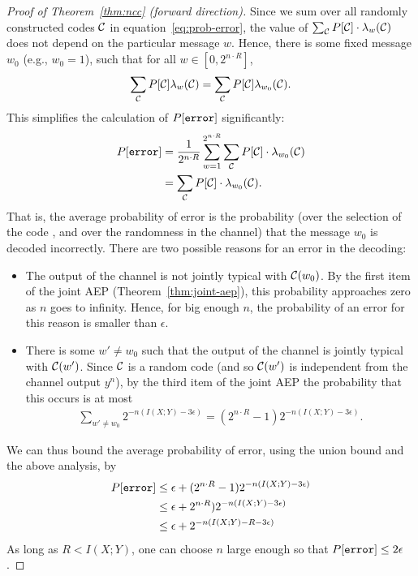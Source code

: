 \begin{proof}[Proof of Theorem~\ref{thm:ncc} (forward direction)]
Since we sum over all randomly constructed codes $\mathcal{C}$ in equation~\ref{eq:prob-error}, the value of $\sum_{\mathcal{C}} P[\mathcal{C}] \cdot \lambda_w(\mathcal{C})$ does not depend on the particular message $w$. Hence, there is some fixed message $w_0$ (e.g., $w_0 = 1$), such that for all $w \in [0,2^{n \cdot R}]$,
\begin{align}
\sum_{\mathcal{C}} P[\mathcal{C}] \lambda_w(\mathcal{C}) = \sum_{\mathcal{C}} P[\mathcal{C}] \lambda_{w_0}(\mathcal{C}).
\end{align}
This simplifies the calculation of $P[\texttt{error}]$ significantly:
\begin{align}
P[\texttt{error}] &= \frac{1}{2^{n \cdot R}} \sum_{w = 1}^{2^{n \cdot R}} \sum_{\mathcal{C}} P[\mathcal{C}] \cdot \lambda_{w_0}(\mathcal{C})\nonumber\\
&= \sum_{\mathcal{C}} P[\mathcal{C}] \cdot \lambda_{w_0}(\mathcal{C}).
\end{align}
That is, the average probability of error is the probability (over the selection of the code \cran, and over the randomness in the channel) that the message $w_0$ is decoded incorrectly. There are two possible reasons for an error in the decoding:
\begin{itemize}
\item The output of the channel is not jointly typical with $\mathcal{C}(w_0)$. By the first item of the joint AEP (Theorem~\ref{thm:joint-aep}), this probability approaches zero as $n$ goes to infinity. Hence, for big enough $n$, the probability of an error for this reason is smaller than $\epsilon$.
\item There is some $w' \neq w_0$ such that the output of the channel is jointly typical with $\mathcal{C}(w')$. Since $\mathcal{C}$ is a random code (and so $\mathcal{C}(w')$ is independent from the channel output $y^n$), by the third item of the joint AEP the probability that this occurs is at most
\begin{align}
\sum_{w' \neq w_0} 2^{-n (I(X;Y) - 3 \epsilon)} = (2^{n \cdot R} - 1) 2^{-n (I(X;Y) - 3 \epsilon)}.
\end{align}
\end{itemize}
We can thus bound the average probability of error, using the union bound and the above analysis, by
\begin{align}
P[\texttt{error}] &\leq \epsilon + (2^{n \cdot R} - 1) 2^{-n (I(X;Y) - 3 \epsilon)}\nonumber\\
&\leq \epsilon + 2^{n \cdot R}) 2^{-n (I(X;Y) - 3 \epsilon)}\nonumber\\
&\leq \epsilon + 2^{-n (I(X;Y) - R - 3 \epsilon)}\nonumber\\
\end{align}
As long as $R < I(X;Y)$, one can choose $n$ large enough so that $P[\texttt{error}] \leq 2 \epsilon$.


\end{proof}
